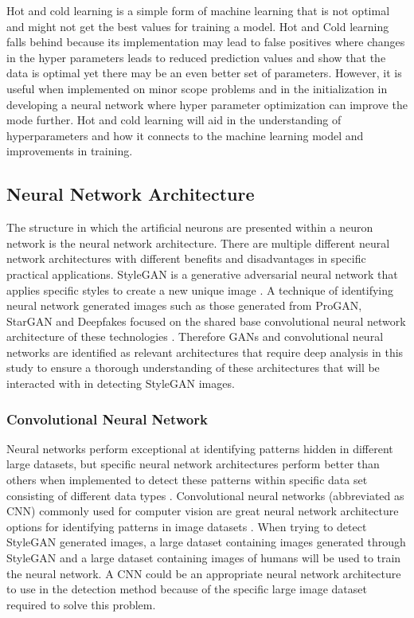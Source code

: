 Hot and cold learning is a simple form of machine learning that is not optimal and might not get the best values for training a model. Hot and Cold learning falls behind because its implementation may lead to false positives where changes in the hyper parameters leads to reduced prediction values and show that the data is optimal yet there may be an even better set of parameters. However, it is useful when implemented on minor scope problems and in the initialization in developing a neural network where hyper parameter optimization can improve the mode further. Hot and cold learning will aid in the understanding of hyperparameters and how it connects to the machine learning model and improvements in training.

\subsection{Neural Network Architecture}

The structure in which the artificial neurons are presented within a neuron network is the neural network architecture. There are multiple different neural network architectures with different benefits and disadvantages in specific practical applications. StyleGAN is a generative adversarial neural network that applies specific styles to create a new unique image \citep{Karras2019}. A technique of identifying neural network generated images such as those generated from ProGAN, StarGAN and Deepfakes focused on the shared base convolutional neural network architecture of these technologies \citep{Wang}. Therefore GANs and convolutional neural networks are identified as relevant architectures that require deep analysis in this study to ensure a thorough understanding of these architectures that will be interacted with in detecting StyleGAN images.

\subsubsection{Convolutional Neural Network}

Neural networks perform exceptional at identifying patterns hidden in different large datasets, but specific neural network architectures perform better than others when implemented to detect these patterns within specific data set consisting of different data types \citep{Liu2017}. Convolutional neural networks (abbreviated as CNN) commonly used for computer vision are great neural network architecture options for identifying patterns in image datasets \citep{Albawi, Yosinski2015}. When trying to detect StyleGAN generated images, a large dataset containing images generated through StyleGAN and a large dataset containing images of humans will be used to train the neural network. A CNN could be an appropriate neural network architecture to use in the detection method because of the specific large image dataset required to solve this problem.

